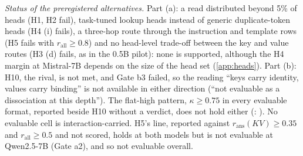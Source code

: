 \begin{table}[p]
\centering
\footnotesize
\caption{\textbf{Preregistration H.} GPU stage 6, scored by \texttt{analysis/stage6\_score.py}. Predictions, gates, scoring script and code were finalised at \texttt{stage6-run}, before any stage-6 run and before any output of G was inspected; the run used that commit. Part (a), gates a1--a3 and H1--H6: Qwen2.5-7B / Mistral-7B (Instruct), \fmtOpt{} unless stated, BF16, eager attention, 60 ranking and 60 held-out evaluation stories, $k^*$ = 5\% of heads; a prediction over both models is met only if it is met in both. Part (b), gates b0--b3 and H7--H12: Qwen2.5-14B-Instruct on the material of \citet{prakash2025lookbacks}, $n = \PkN{}$ pairs, BF16; triples are \fmtNone{} / \textsc{qnames} / \fmtOpt{}; $\ell^* = \PkLstar{}$, $\ell^*_{\mathrm{ID}} = \PkLstarId{}$. met$^*$: met except in the cell named in the Observed column. 95\% bootstrap CIs (10{,}000 resamples). In all, \HcountMet{} met (H1--H5, H11), \HcountNotMet{} not met (H7--H10), \HcountNotEval{} not evaluable (H6) and \HcountNotRun{} not run (H12). Details in \cref{app:heads,app:prakash}.}
\label{tab:prereg-h}


\smallskip
\begin{minipage}{0.94\textwidth}
\footnotesize
\emph{Status of the preregistered alternatives.} Part (a): a read distributed beyond 5\% of heads (H1, H2 fail), task-tuned lookup heads instead of generic duplicate-token heads (H4 (i) fails), a three-hop route through the instruction and template rows (H5 fails with $r_{\mathrm{all}} \geq 0.8$) and no head-level trade-off between the key and value routes (H3 (d) fails, as in the 0.5B pilot): none is supported, although the H4 margin at Mistral-7B depends on the size of the head set (\cref{app:heads}). Part (b): H10, the rival, is not met, and Gate b3 failed, so the reading ``keys carry identity, values carry binding'' is not available in either direction (``not evaluable as a dissociation at this depth''). The flat-high pattern, $\kappa \geq 0.75$ in every evaluable format, reported beside H10 without a verdict, does not hold either (\fmtNone{}: \PkKappaBindNone{}). No evaluable cell is interaction-carried. H5's \fmtPost{} line, reported against $r_{\mathrm{ans}}(KV) \geq 0.35$ and $r_{\mathrm{all}} \geq 0.5$ and not scored, holds at both models but is not evaluable at Qwen2.5-7B (Gate a2), and so not evaluable overall.
\end{minipage}
\end{table}

